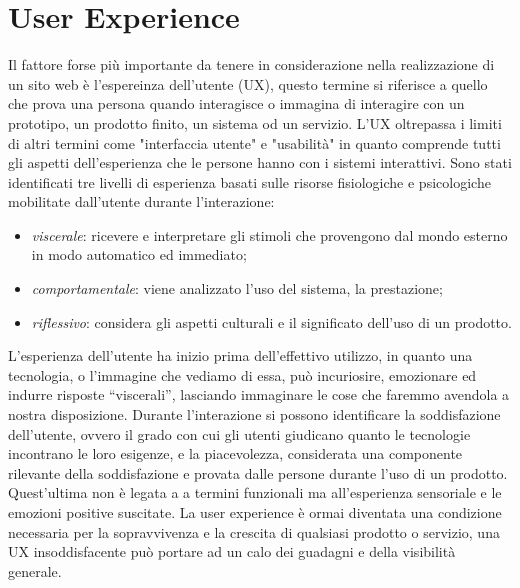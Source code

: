 \documentclass[target=bach,aauheader=]{thud}
\begin{document}
\section{User Experience}
Il fattore forse più importante da tenere in considerazione nella realizzazione di un sito web è l'espereinza dell'utente (UX), questo termine si riferisce a quello che prova una persona quando interagisce o immagina di interagire con un prototipo, un prodotto finito, un sistema od un servizio.
L'UX oltrepassa i limiti di altri termini come "interfaccia utente" e "usabilità" in quanto comprende tutti gli aspetti dell'esperienza che le persone hanno con i sistemi interattivi.
\newline 
Sono stati identificati tre livelli di esperienza basati sulle risorse fisiologiche e psicologiche mobilitate dall'utente durante l'interazione:
\begin{itemize}
    \item \textit{viscerale}: ricevere e interpretare gli stimoli che provengono dal mondo esterno in modo automatico ed immediato;
    \item \textit{comportamentale}: viene analizzato l'uso del sistema, la prestazione;
    \item \textit{riflessivo}: considera gli aspetti culturali e il significato dell'uso di un prodotto.
\end{itemize}
L'esperienza dell'utente ha inizio prima dell'effettivo utilizzo, in quanto una tecnologia, o l'immagine che vediamo di essa, può incuriosire, emozionare ed indurre risposte “viscerali”, lasciando immaginare le cose che faremmo avendola a nostra disposizione.
Durante l'interazione si possono identificare la soddisfazione dell'utente, ovvero il grado con cui gli utenti giudicano quanto le tecnologie incontrano le loro esigenze, e la piacevolezza, considerata una componente rilevante della soddisfazione e provata dalle persone durante l'uso di un prodotto.
Quest'ultima non è legata a a termini funzionali ma all'esperienza sensoriale e le emozioni positive suscitate. 
\newline
La user experience è ormai diventata una condizione necessaria per la sopravvivenza e la crescita di qualsiasi prodotto o servizio, una UX insoddisfacente può portare ad un calo dei guadagni e della visibilità generale.
\end{document}
